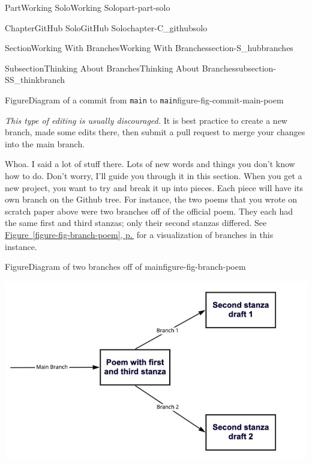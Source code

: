 \documentclass[twoside,10pt,]{book}
\newcommand{\xreffont}{\relax}
\newcommand{\mono}[1]{\texttt{#1}}
\begin{document}
\begin{partptx}{Part}{Working Solo}{}{Working Solo}{}{}{part-part-solo}
\begin{chapterptx}{Chapter}{GitHub Solo}{}{GitHub Solo}{}{}{chapter-C_githubsolo}
\begin{sectionptx}{Section}{Working With Branches}{}{Working With Branches}{}{}{section-S_hubbranches}
\begin{subsectionptx}{Subsection}{Thinking About Branches}{}{Thinking About Branches}{}{}{subsection-SS_thinkbranch}
\begin{figureptx}{Figure}{Diagram of a commit from \mono{main} to \mono{main}}{figure-fig-commit-main-poem}{}
\begin{image}{0.05}{0.9}{0.05}{}
\end{image}%
\tcblower
\end{figureptx}%
\emph{This type of editing is usually discouraged.} It is best practice to create a new branch, made some edits there, then submit a pull request to merge your changes into the main branch.%
\par
Whoa. I said a lot of stuff there. Lots of new words and things you don't know how to do. Don't worry, I'll guide you through it in this section. When you get a new project, you want to try and break it up into pieces. Each piece will have its own branch on the Github tree. For instance, the two poems that you wrote on scratch paper above were two branches off of the official poem. They each had the same first and third stanzas; only their second stanzas differed. See \hyperref[figure-fig-branch-poem]{Figure~{\xreffont\ref{figure-fig-branch-poem}}, p.\,\pageref{figure-fig-branch-poem}} for a visualization of branches in this instance.%
\begin{figureptx}{Figure}{Diagram of two branches off of main}{figure-fig-branch-poem}{}%
\begin{image}{0}{1}{0}{}%
\includegraphics[width=\linewidth]{external/branch_poem.pdf}
\end{image}%
\tcblower
\end{figureptx}%

\end{subsectionptx}
\end{sectionptx}
\end{chapterptx}
\end{partptx}
\end{document}
